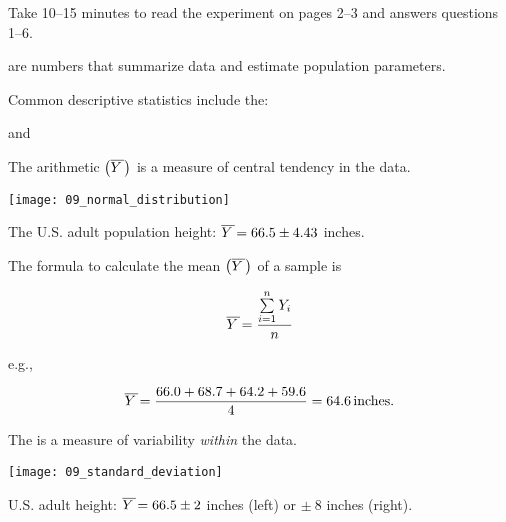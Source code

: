 \documentclass[t]{beamer}
\newcommand*\meanY{\overline{Y\kern1.67pt}\kern-1.67pt}
\begin{document}
%
\begin{frame}[t]{Take 10–15 minutes to read the experiment on pages 2–3 and answers questions 1–6.}

\end{frame}
%
\begin{frame}[t]{ are numbers that summarize data and estimate population parameters.}

\hangpara Common descriptive statistics include the:

\hangpara \hspace{1em} 

\hangpara \hspace{1em}  and

\hangpara \hspace{1em} 

\end{frame}
%
{
\begin{frame}[t]{The arithmetic  $\left(\meanY\kern1.67pt\right)$ is a measure of central tendency in the data.}

	\vspace*{-0.5\baselineskip}
	
	{\centering 
	\texttt{[image: 09\_normal\_distribution]} \par
	}
	
	\hangpara The U.S. adult population height: $\meanY = 66.5 \pm 4.43$ inches.
	
\end{frame}
}
%
\begin{frame}[t]{The formula to calculate the mean $\left(\meanY\kern1.67pt\right)$ of a sample is}

{\Large
\[ \meanY = \frac{\sum\limits^n_{i=1} Y_i}{n} \]
}

\pause\hangpara e.g.,

\[ \meanY = \frac{66.0 + 68.7 + 64.2 + 59.6}{4} = 64.6\,\mathrm{inches.} \]

\end{frame}
%
\begin{frame}[t]{The  is a measure of variability \emph{within} the data.}

	\vspace*{-0.5\baselineskip}
	
	{\centering 
	\texttt{[image: 09\_standard\_deviation]} \par
	}
	
	\hangpara U.S. adult height: $\meanY = 66.5 \pm 2$ inches (left) or $ \pm\ 8$ inches (right). 
	
\end{frame}
\end{document}
